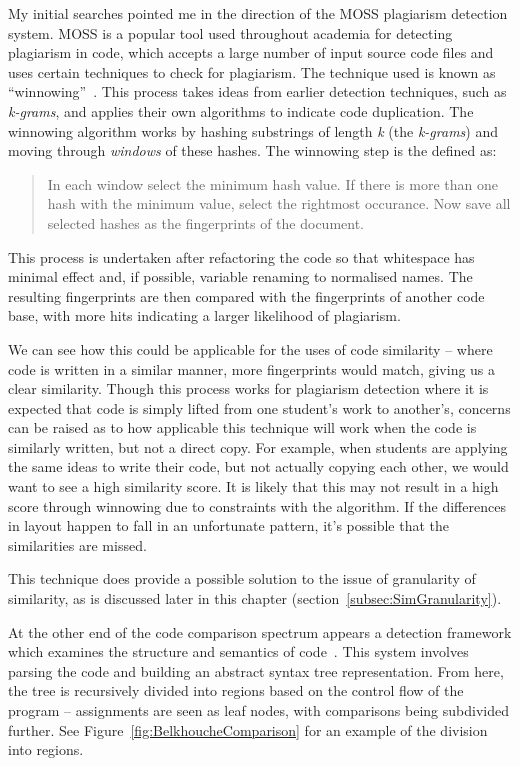 My initial searches pointed me in the direction of the MOSS plagiarism detection
system. MOSS is a popular tool used throughout academia for detecting plagiarism
in code, which accepts a large number of input source code files and uses certain
techniques to check for plagiarism. The technique used is known as 
``winnowing''~\cite{winnowing}. This process takes ideas from earlier detection
techniques, such as \emph{k-grams}, and applies their own algorithms to indicate
code duplication. The winnowing algorithm works by hashing substrings of length
\emph{k} (the \emph{k-grams}) and moving through \emph{windows} of these hashes.
The winnowing step is the defined as: 
\begin{quote}In each window select the minimum hash value.
If there is more than one hash with the minimum value, select the rightmost
occurance. Now save all selected hashes as the fingerprints of the document.
\cite{winnowing}
\end{quote}

This process is undertaken after refactoring the code so that whitespace
has minimal effect and, if possible, variable renaming to normalised names.
The resulting fingerprints are then compared with the fingerprints of another
code base, with more hits indicating a larger likelihood of plagiarism.

We can see how this could be applicable for the uses of code similarity -- 
where code is written in a similar manner, more fingerprints would match,
giving us a clear similarity. Though this process works for plagiarism detection
where it is expected that code is simply lifted from one student's work to
another's, concerns can be raised as to how applicable this technique will work
when the code is similarly written, but not a direct copy. For example, when 
students are applying the same ideas to write their code, but not actually
copying each other, we would want to see a high similarity score. It is likely
that this may not result in a high score through winnowing due to constraints
with the algorithm. If the differences in layout happen to fall in an unfortunate
pattern, it's possible that the similarities are missed.

This technique does provide a possible solution to the issue of granularity of
similarity, as is discussed later in this chapter (section~\ref{subsec:SimGranularity}).

At the other end of the code comparison spectrum appears a detection framework
which examines the structure and semantics of code~\cite{Belkhouche}. This system
involves parsing the code and building an abstract syntax tree representation.
From here, the tree is recursively divided into regions based on the control
flow of the program -- assignments are seen as leaf nodes, with comparisons being
subdivided further. See Figure~\ref{fig:BelkhoucheComparison} for an example of
the division into regions.

